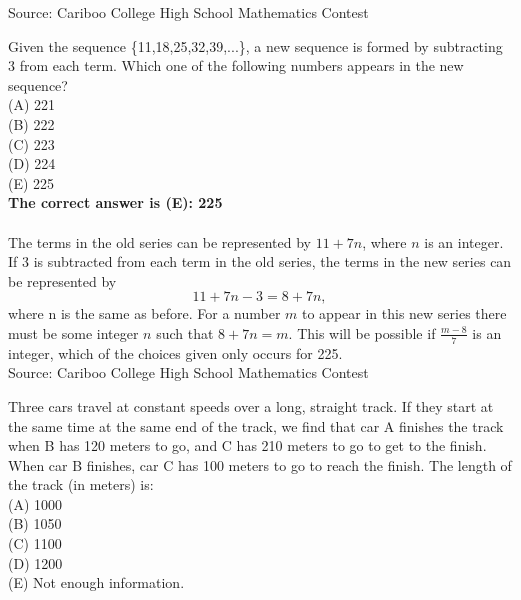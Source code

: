 \documentclass{article}
\begin{document}
\scriptsize
Source: Cariboo College High School Mathematics Contest

\normalsize
Given the sequence \{11,18,25,32,39,...\}, a new sequence is formed by subtracting 3 from each term. Which one of the following numbers appears in the new sequence?\\
(A) 221\\
(B) 222\\
(C) 223\\
(D) 224\\
(E) 225\\


\textbf{The correct answer is (E): 225\\}\\[1 ex]
The terms in the old series can be represented by $11+7n$, where $n$ is an integer. If 3 is subtracted from each term in the old series, the terms in the new series can be represented by
\begin{equation*}
11+7n-3=8+7n,
\end{equation*}
where n is the same as before. For a number $m$ to appear in this new series there must be some integer $n$ such that $8+7n=m$. This will be possible if $\frac{m-8}{7}$ is an integer, which of the choices given only occurs for 225.
\\[5 ex]

\scriptsize
Source: Cariboo College High School Mathematics Contest

\normalsize
Three cars travel at constant speeds over a long, straight track. If they start at the same time at the same end of the track, we find that car A finishes the track when B has 120 meters to go, and C has 210 meters to go to get to the finish. When car B finishes, car C has 100 meters to go to reach the finish. The length of the track (in meters) is:\\
(A) 1000\\
(B) 1050\\
(C) 1100\\
(D) 1200\\
(E) Not enough information.\\
\end{document}
